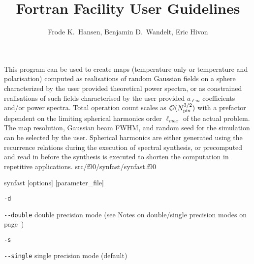 
\sloppy


\title{\healpix Fortran Facility User Guidelines}
 \section[synfast]{\nosectionname}
\label{fac:synfast}
\author{Frode K.~Hansen, Benjamin D.~Wandelt, Eric Hivon}

\begin{facility}
{This program can be used to create  \healpix maps (temperature only
or temperature and polarisation)  computed as realisations 
of random Gaussian
fields on a sphere characterized by the user provided 
theoretical power spectra,
or as constrained realisations of such fields characterised by the user
provided $a_{\ell m}$ coefficients and/or power spectra.
Total operation count scales as
 ${\cal {O}}(N_{\rm pix}^{3/2})$ with a prefactor dependent on the limiting spherical harmonics
order $\ell_{max}$ of the actual problem. 
The map resolution, Gaussian beam FWHM,  
and random seed for the simulation can be selected by the user.
Spherical harmonics are either generated using the recurrence relations
during the execution of spectral synthesis, or  precomputed and read in
before the synthesis is executed to shorten the computation in repetitive
applications.}
{src/f90/synfast/synfast.f90}
\end{facility}

\begin{f90facility}
{synfast [options] [parameter\_file]}
\end{f90facility}

\begin{options}
  \begin{optionlistwide}{} %
    \item[{\tt -d}]
    \item[{\tt -}{\tt -}{\tt double}] double precision mode (see Notes on double/single precision modes on page~\pageref{page:ioprec})
    \item[{\tt -s}]
    \item[{\tt -}{\tt -}{\tt single}] single precision mode (default)
  \end{optionlistwide}
\end{options}

